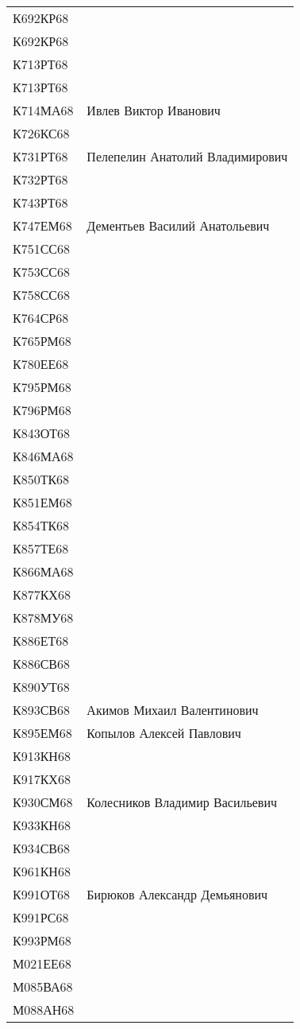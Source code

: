 \documentclass[a4paper,12pt]{article}
\begin{document}
\begin{longtable}{ ll }
К692КР68 &  \\ 
К692КР68 &  \\ 
К713РТ68 &  \\ 
К713РТ68 &  \\ 
К714МА68 & Ивлев Виктор Иванович \\ 
К726КС68 &  \\ 
К731РТ68 & Пелепелин Анатолий Владимирович \\ 
К732РТ68 &  \\ 
К743РТ68 &  \\ 
К747ЕМ68 & Дементьев Василий Анатольевич \\ 
К751СС68 &  \\ 
К753СС68 &  \\ 
К758СС68 &  \\ 
К764СР68 &  \\ 
К765РМ68 &  \\ 
К780ЕЕ68 &  \\ 
К795РМ68 &  \\ 
К796РМ68 &  \\ 
К843ОТ68 &  \\ 
К846МА68 &  \\ 
К850ТК68 &  \\ 
К851ЕМ68 &  \\ 
К854ТК68 &  \\ 
К857ТЕ68 &  \\ 
К866МА68 &  \\ 
К877КХ68 &  \\ 
К878МУ68 &  \\ 
К886ЕТ68 &  \\ 
К886СВ68 &  \\ 
К890УТ68 &  \\ 
К893СВ68 & Акимов Михаил Валентинович \\ 
К895ЕМ68 & Копылов Алексей Павлович \\ 
К913КН68 &  \\ 
К917КХ68 &  \\ 
К930СМ68 & Колесников Владимир Васильевич \\ 
К933КН68 &  \\ 
К934СВ68 &  \\ 
К961КН68 &  \\ 
К991ОТ68 & Бирюков Александр Демьянович \\ 
К991РС68 &  \\ 
К993РМ68 &  \\ 
М021ЕЕ68 &  \\ 
М085ВА68 &  \\ 
М088АН68 &  \\ 

\end{longtable}
\end{document}
